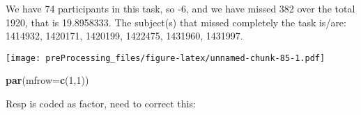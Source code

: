 \documentclass[
]{article}
\newenvironment{Shaded}{\begin{snugshade}}{\end{snugshade}}
\newcommand{\DataTypeTok}[1]{\textcolor[rgb]{0.13,0.29,0.53}{#1}}
\newcommand{\DecValTok}[1]{\textcolor[rgb]{0.00,0.00,0.81}{#1}}
\newcommand{\KeywordTok}[1]{\textcolor[rgb]{0.13,0.29,0.53}{\textbf{#1}}}
\newcommand{\NormalTok}[1]{#1}
\newcommand{\OperatorTok}[1]{\textcolor[rgb]{0.81,0.36,0.00}{\textbf{#1}}}
\newcommand{\StringTok}[1]{\textcolor[rgb]{0.31,0.60,0.02}{#1}}
\begin{document}
We have 74 participants in this task, so -6, and we have missed 382 over
the total 1920, that is 19.8958333. The subject(s) that missed
completely the task is/are: 1414932, 1420171, 1420199, 1422475, 1431960,
1431997.

\begin{Shaded}
\end{Shaded}

\texttt{[image: preProcessing\_files/figure-latex/unnamed-chunk-85-1.pdf]}

\begin{Shaded}
\begin{Highlighting}[]
\KeywordTok{par}\NormalTok{(}\DataTypeTok{mfrow=}\KeywordTok{c}\NormalTok{(}\DecValTok{1}\NormalTok{,}\DecValTok{1}\NormalTok{))}
\end{Highlighting}
\end{Shaded}

Resp is coded as factor, need to correct this:

\begin{Shaded}
\end{Shaded}

\begin{Shaded}
\end{Shaded}
\end{document}

